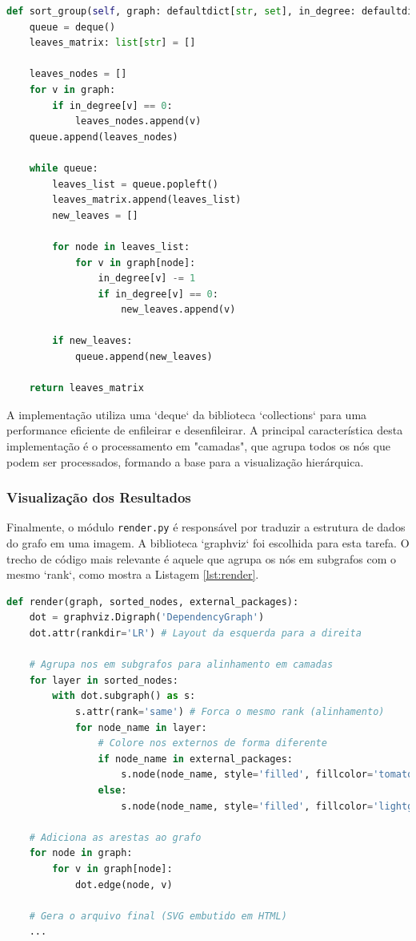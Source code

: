 \documentclass[12pt]{article}
\begin{document}
\begin{lstlisting}[language=Python, caption={Trecho do código de ordenação topológica (Kahn).}, label={lst:sort-group}]
def sort_group(self, graph: defaultdict[str, set], in_degree: defaultdict[str, int]) -> list[str]:
    queue = deque()
    leaves_matrix: list[str] = []

    leaves_nodes = []
    for v in graph:
        if in_degree[v] == 0:
            leaves_nodes.append(v)
    queue.append(leaves_nodes)

    while queue:
        leaves_list = queue.popleft()
        leaves_matrix.append(leaves_list)
        new_leaves = []

        for node in leaves_list:
            for v in graph[node]:
                in_degree[v] -= 1
                if in_degree[v] == 0:
                    new_leaves.append(v)

        if new_leaves:
            queue.append(new_leaves)

    return leaves_matrix
\end{lstlisting}

A implementação utiliza uma `deque` da biblioteca `collections` para uma performance eficiente de enfileirar e desenfileirar. A principal característica desta implementação é o processamento em "camadas", que agrupa todos os nós que podem ser processados, formando a base para a visualização hierárquica.

\subsubsection{Visualização dos Resultados}
Finalmente, o módulo \texttt{render.py} é responsável por traduzir a estrutura de dados do grafo em uma imagem. A biblioteca `graphviz` \cite{graphviz} foi escolhida para esta tarefa. O trecho de código mais relevante é aquele que agrupa os nós em subgrafos com o mesmo `rank`, como mostra a Listagem \ref{lst:render}.

\begin{lstlisting}[language=Python, caption={Trecho do código de renderização do grafo.}, label={lst:render}]
def render(graph, sorted_nodes, external_packages):
    dot = graphviz.Digraph('DependencyGraph')
    dot.attr(rankdir='LR') # Layout da esquerda para a direita

    # Agrupa nos em subgrafos para alinhamento em camadas
    for layer in sorted_nodes:
        with dot.subgraph() as s:
            s.attr(rank='same') # Forca o mesmo rank (alinhamento)
            for node_name in layer:
                # Colore nos externos de forma diferente
                if node_name in external_packages:
                    s.node(node_name, style='filled', fillcolor='tomato')
                else:
                    s.node(node_name, style='filled', fillcolor='lightgrey')
    
    # Adiciona as arestas ao grafo
    for node in graph:
        for v in graph[node]:
            dot.edge(node, v)
    
    # Gera o arquivo final (SVG embutido em HTML)
    ...
\end{lstlisting}
\end{document}
